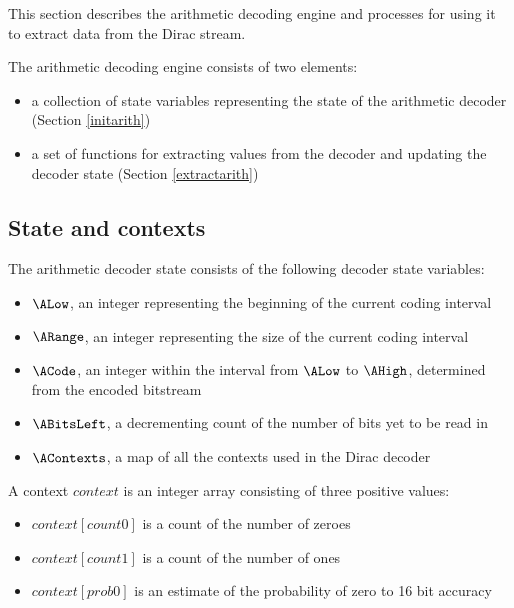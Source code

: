 
\label{arithdecoding}

This section describes the arithmetic decoding engine and
processes for using it to extract data from the Dirac stream.

The arithmetic decoding engine consists of two elements: 

\begin{itemize}
\item a collection of state variables representing the state of the arithmetic 
decoder (Section \ref{initarith})
\item a set of functions for extracting values from the decoder 
and updating the decoder state (Section \ref{extractarith})
\end{itemize}

\subsection{State and contexts}
\label{arithcontexts}

The arithmetic decoder state consists of the following decoder state variables:

\begin{itemize}
\item $\ALow$, an integer representing the beginning of the current coding interval
\item $\ARange$, an integer representing the size of the current coding interval
\item $\ACode$, an integer within the interval from $\ALow$ to $\AHigh$, determined from the encoded bitstream
\item $\ABitsLeft$, a decrementing count of the number of bits yet to be read in
\item $\AContexts$, a map of all the contexts used in the Dirac decoder
\end{itemize}

A context $context$ is an integer array consisting of three positive values:
\begin{itemize}
\item $context[count0]$ is a count of the number of zeroes
\item $context[count1]$ is a count of the number of ones
\item $context[prob0]$ is an estimate of the probability of zero to 16 bit accuracy
\end{itemize}

